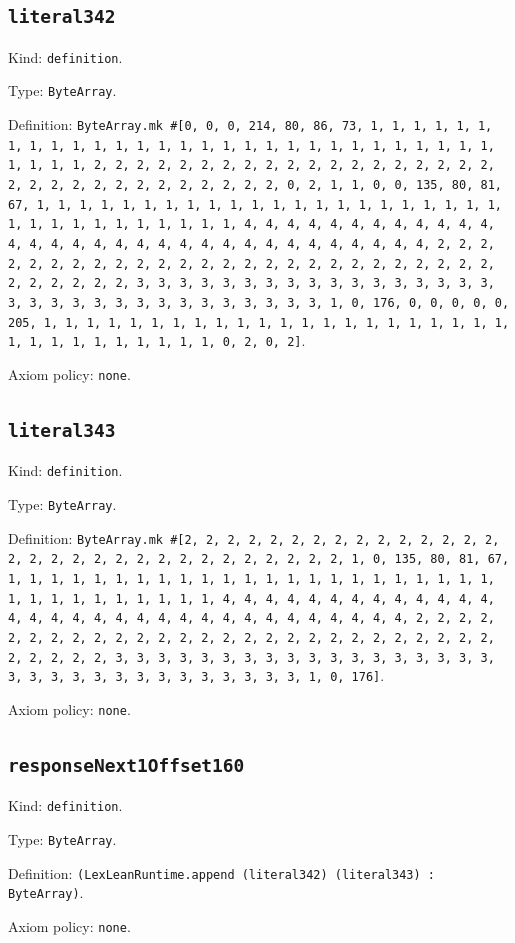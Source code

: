 \documentclass[11pt]{article}
\begin{document}
\subsection*{\texttt{literal342}}
\noindent Kind: \texttt{definition}.\par
\noindent Type: \texttt{ByteArray}.\par
\noindent Definition: \texttt{ByteArray.mk \#[0, 0, 0, 214, 80, 86, 73, 1, 1, 1, 1, 1, 1, 1, 1, 1, 1, 1, 1, 1, 1, 1, 1, 1, 1, 1, 1, 1, 1, 1, 1, 1, 1, 1, 1, 1, 1, 1, 1, 1, 2, 2, 2, 2, 2, 2, 2, 2, 2, 2, 2, 2, 2, 2, 2, 2, 2, 2, 2, 2, 2, 2, 2, 2, 2, 2, 2, 2, 2, 2, 2, 2, 0, 2, 1, 1, 0, 0, 135, 80, 81, 67, 1, 1, 1, 1, 1, 1, 1, 1, 1, 1, 1, 1, 1, 1, 1, 1, 1, 1, 1, 1, 1, 1, 1, 1, 1, 1, 1, 1, 1, 1, 1, 1, 1, 4, 4, 4, 4, 4, 4, 4, 4, 4, 4, 4, 4, 4, 4, 4, 4, 4, 4, 4, 4, 4, 4, 4, 4, 4, 4, 4, 4, 4, 4, 4, 4, 2, 2, 2, 2, 2, 2, 2, 2, 2, 2, 2, 2, 2, 2, 2, 2, 2, 2, 2, 2, 2, 2, 2, 2, 2, 2, 2, 2, 2, 2, 2, 2, 3, 3, 3, 3, 3, 3, 3, 3, 3, 3, 3, 3, 3, 3, 3, 3, 3, 3, 3, 3, 3, 3, 3, 3, 3, 3, 3, 3, 3, 3, 3, 3, 1, 0, 176, 0, 0, 0, 0, 0, 205, 1, 1, 1, 1, 1, 1, 1, 1, 1, 1, 1, 1, 1, 1, 1, 1, 1, 1, 1, 1, 1, 1, 1, 1, 1, 1, 1, 1, 1, 1, 1, 1, 0, 2, 0, 2]}.\par
\noindent Axiom policy: \texttt{none}.\par
\subsection*{\texttt{literal343}}
\noindent Kind: \texttt{definition}.\par
\noindent Type: \texttt{ByteArray}.\par
\noindent Definition: \texttt{ByteArray.mk \#[2, 2, 2, 2, 2, 2, 2, 2, 2, 2, 2, 2, 2, 2, 2, 2, 2, 2, 2, 2, 2, 2, 2, 2, 2, 2, 2, 2, 2, 2, 2, 1, 0, 135, 80, 81, 67, 1, 1, 1, 1, 1, 1, 1, 1, 1, 1, 1, 1, 1, 1, 1, 1, 1, 1, 1, 1, 1, 1, 1, 1, 1, 1, 1, 1, 1, 1, 1, 1, 1, 4, 4, 4, 4, 4, 4, 4, 4, 4, 4, 4, 4, 4, 4, 4, 4, 4, 4, 4, 4, 4, 4, 4, 4, 4, 4, 4, 4, 4, 4, 4, 4, 2, 2, 2, 2, 2, 2, 2, 2, 2, 2, 2, 2, 2, 2, 2, 2, 2, 2, 2, 2, 2, 2, 2, 2, 2, 2, 2, 2, 2, 2, 2, 2, 3, 3, 3, 3, 3, 3, 3, 3, 3, 3, 3, 3, 3, 3, 3, 3, 3, 3, 3, 3, 3, 3, 3, 3, 3, 3, 3, 3, 3, 3, 3, 3, 1, 0, 176]}.\par
\noindent Axiom policy: \texttt{none}.\par
\subsection*{\texttt{responseNext1Offset160}}
\noindent Kind: \texttt{definition}.\par
\noindent Type: \texttt{ByteArray}.\par
\noindent Definition: \texttt{(LexLeanRuntime.append (literal342) (literal343) : ByteArray)}.\par
\noindent Axiom policy: \texttt{none}.\par
\end{document}
